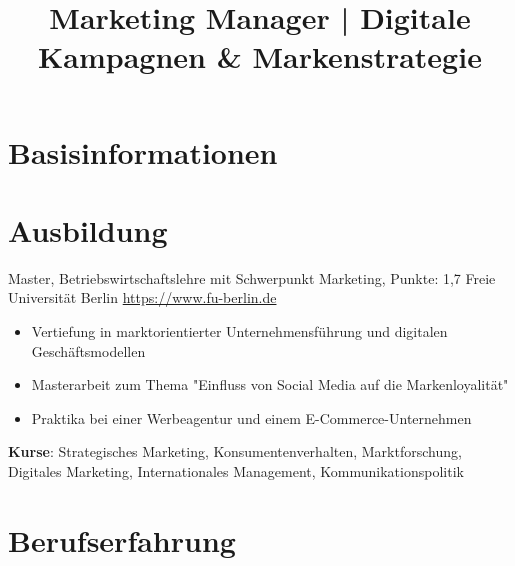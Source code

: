\documentclass[a4paper, serif, 10pt]{moderncv}
\title{Marketing Manager | Digitale Kampagnen \& Markenstrategie}
\begin{document}
\maketitle

\section{Basisinformationen}

\section{Ausbildung}

        {Master, Betriebswirtschaftslehre mit Schwerpunkt Marketing, Punkte: 1,7}
        {Freie Universität Berlin}
        {\url{https://www.fu-berlin.de}}
        {}
        {\begin{itemize}
\item Vertiefung in marktorientierter Unternehmensführung und digitalen Geschäftsmodellen
\item Masterarbeit zum Thema "Einfluss von Social Media auf die Markenloyalität"
\item Praktika bei einer Werbeagentur und einem E-Commerce-Unternehmen
\end{itemize}
\textbf{Kurse}: Strategisches Marketing, Konsumentenverhalten, Marktforschung, Digitales Marketing, Internationales Management, Kommunikationspolitik}
\section{Berufserfahrung}
\end{document}
